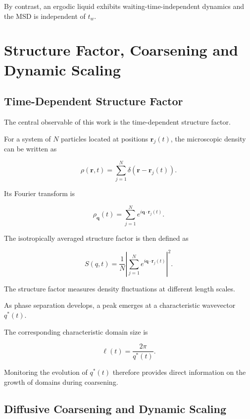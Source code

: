 \documentclass[11pt,a4paper]{article}
\begin{document}
By contrast, an ergodic liquid exhibits waiting-time-independent dynamics and the MSD is independent of $t_w$.

\section{Structure Factor, Coarsening and Dynamic Scaling}

\subsection{Time-Dependent Structure Factor}

The central observable of this work is the time-dependent structure factor.

For a system of $N$ particles located at positions $\mathbf r_j(t)$, the microscopic density can be written as

\begin{equation}
\rho(\mathbf r,t)
=
\sum_{j=1}^{N}
\delta(\mathbf r-\mathbf r_j(t)).
\end{equation}

Its Fourier transform is

\begin{equation}
\rho_{\mathbf q}(t)
=
\sum_{j=1}^{N}
e^{i\mathbf q\cdot\mathbf r_j(t)}.
\end{equation}

The isotropically averaged structure factor is then defined as

\begin{equation}
S(q,t)
=
\frac{1}{N}
\left|
\sum_{j=1}^{N}
e^{i\mathbf q\cdot\mathbf r_j(t)}
\right|^2.
\label{eq:Sq}
\end{equation}

The structure factor measures density fluctuations at different length scales.

As phase separation develops, a peak emerges at a characteristic wavevector $q^*(t)$.

The corresponding characteristic domain size is

\begin{equation}
\ell(t)
=
\frac{2\pi}{q^*(t)}.
\label{eq:length}
\end{equation}

Monitoring the evolution of $q^*(t)$ therefore provides direct information on the growth of domains during coarsening.

\subsection{Diffusive Coarsening and Dynamic Scaling}
\end{document}
